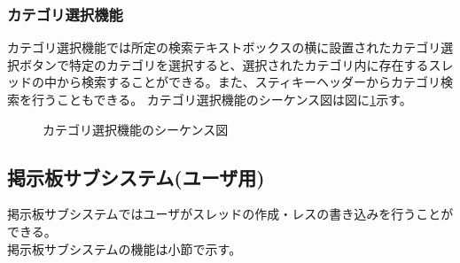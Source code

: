 \documentclass[a4j]{jarticle}
\begin{document}
  \subsubsection{カテゴリ選択機能}
  カテゴリ選択機能では所定の検索テキストボックスの横に設置されたカテゴリ選択ボタンで特定のカテゴリを選択すると、選択されたカテゴリ内に存在するスレッドの中から検索することができる。また、スティキーヘッダーからカテゴリ検索を行うこともできる。
  カテゴリ選択機能のシーケンス図は図に\ref{fig:search_category.png}示す。
  \begin{figure}[H]
    \centering
    \caption{カテゴリ選択機能のシーケンス図}
    \label{fig:search_category.png}
  \end{figure}
  \subsection{掲示板サブシステム(ユーザ用)}
  掲示板サブシステムではユーザがスレッドの作成・レスの書き込みを行うことができる。\\
  掲示板サブシステムの機能は小節で示す。
\end{document}
